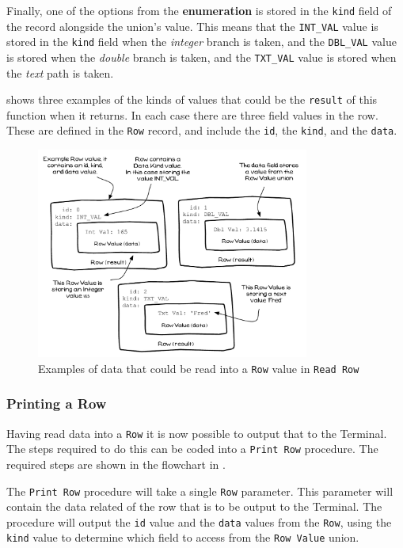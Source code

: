 Finally, one of the options from the \textbf{enumeration} is stored in the \texttt{kind} field of the record alongside the union's value. This means that the \texttt{INT\_VAL} value is stored in the \texttt{kind} field when the \emph{integer} branch is taken, and the \texttt{DBL\_VAL} value is stored when the \emph{double} branch is taken, and the \texttt{TXT\_VAL} value is stored when the \emph{text} path is taken.

 shows three examples of the kinds of values that could be the \texttt{result} of this function when it returns. In each case there are three field values in the row. These are defined in the \texttt{Row} record, and include the \texttt{id}, the \texttt{kind}, and the \texttt{data}.

\begin{figure}[htbp]
   \centering
   \includegraphics[width=0.8\textwidth]{./topics/type-decl/diagrams/RowDataRead} 
   \caption{Examples of data that could be read into a \texttt{Row} value in \texttt{Read Row}}
   \label{fig:read-row-data}
\end{figure}

\clearpage
\subsubsection{Printing a Row} %
\label{ssub:printing_a_row}

Having read data into a \texttt{Row} it is now possible to output that to the Terminal. The steps required to do this can be coded into a \texttt{Print Row} procedure. The required steps are shown in the flowchart in .

The \texttt{Print Row} procedure will take a single \texttt{Row} parameter. This parameter will contain the data related of the row that is to be output to the Terminal. The procedure will output the \texttt{id} value and the \texttt{data} values from the \texttt{Row}, using the \texttt{kind} value to determine which field to access from the \texttt{Row Value} union.

